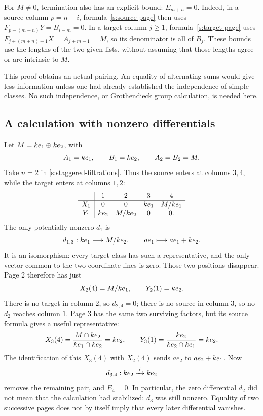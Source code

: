 For $M\ne0$, termination also has an explicit bound: $E_{m+n}=0$.
Indeed, in a source column $p=n+i$, formula~\eqref{s:source-page}
then uses $F_{p-(m+n)}Y=B_{i-m}=0$. In a target column $j\geq1$,
formula~\eqref{s:target-page} uses
$F_{j+(m+n)-1}X=A_{j+m-1}=M$, so its denominator is all of $B_j$.
These bounds use the lengths of the two given lists, without assuming
that those lengths agree or are intrinsic to $M$.

This proof obtains an actual pairing. An equality of alternating sums
would give less information unless one had already established the
independence of simple classes. No such independence, or Grothendieck
group calculation, is needed here.

\subsection{A calculation with nonzero differentials}

Let $M=k e_1\oplus k e_2$, with
\[
A_1=k e_1,\qquad B_1=k e_2,\qquad A_2=B_2=M.
\]
Take $n=2$ in \eqref{s:staggered-filtrations}. Thus the source enters at
columns $3,4$, while the target enters at columns $1,2$:
\[
\begin{array}{c|cccc}
&1&2&3&4\\ \hline
X_1&0&0&k e_1&M/k e_1\\
Y_1&k e_2&M/k e_2&0&0.
\end{array}
\]
The only potentially nonzero $d_1$ is
\[
d_{1,3}:k e_1\longrightarrow M/k e_2,
\qquad ae_1\longmapsto ae_1+k e_2.
\]
It is an isomorphism: every target class has such a representative, and
the only vector common to the two coordinate lines is zero. Those two
positions disappear. Page $2$ therefore has just
\[
X_2(4)=M/k e_1,\qquad Y_2(1)=k e_2.
\]
There is no target in column $2$, so $d_{2,4}=0$; there is no source
in column $3$, so no $d_2$ reaches column $1$. Page $3$ has the same two
surviving factors, but its source formula gives a useful representative:
\[
X_3(4)=\frac{M\cap k e_2}{k e_1\cap k e_2}
       =k e_2,
\qquad
Y_3(1)=\frac{k e_2}{k e_2\cap k e_1}=k e_2.
\]
The identification of this $X_3(4)$ with $X_2(4)$ sends
$ae_2$ to $ae_2+k e_1$. Now
\[
d_{3,4}:k e_2\xrightarrow{\mathrm{id}}k e_2
\]
removes the remaining pair, and $E_4=0$.
In particular, the zero differential $d_2$ did not mean that the
calculation had stabilized: $d_3$ was still nonzero. Equality of two
successive pages does not by itself imply that every later differential
vanishes.

